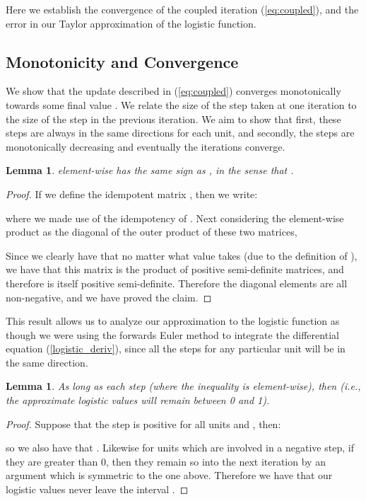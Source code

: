 \documentclass[11pt]{article}
\newtheorem{lem}[thm]{Lemma}
\begin{document}
Here we establish the convergence of the coupled iteration (\ref{eq:coupled}), and the error in our Taylor approximation of the logistic function.


\subsection{Monotonicity and Convergence}\label{sec:convergence}

We show that the update described in (\ref{eq:coupled}) converges monotonically towards some final value .  We  relate the size of the step taken at one iteration  to the size of the step in the previous iteration.  We aim to show that first, these steps are always in the same directions for each unit, and secondly, the steps are monotonically decreasing and eventually the iterations converge.

\begin{lem}
 element-wise has the same sign as , in the sense that .
\end{lem}
\begin{proof}
If we define the idempotent matrix , then we write:

where we made use of the idempotency of .  Next considering the element-wise product as the diagonal of the outer product of these two matrices,



Since we clearly have that  no matter what value  takes (due to the definition of ), we have that this matrix is the product of positive semi-definite matrices, and therefore is itself positive semi-definite.  Therefore the diagonal elements are all non-negative, and we have proved the claim.
\end{proof}

This result allows us to analyze our approximation to the logistic function as though we were using the forwards Euler method to integrate the differential equation (\ref{logistic_deriv}), since all the steps for any particular unit will be in the same direction.

\begin{lem}
As long as each step  (where the inequality is element-wise), then  (i.e., the approximate logistic values will remain between 0 and 1).
\end{lem}
\begin{proof}
Suppose that the step is positive for all units and , then:

so we also have that  .  Likewise for units which are involved in a negative step, if they are greater than 0, then they remain so into the next iteration by an argument which is symmetric to the one above.  Therefore we have that our logistic values never leave the interval .
\end{proof}
\end{document}
